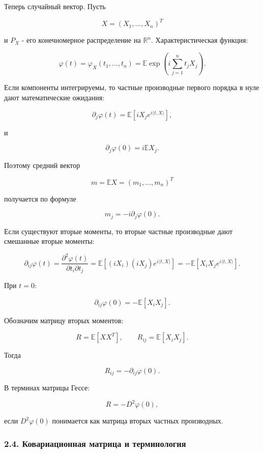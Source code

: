 \documentclass[
  11pt,
  a4paper,
]{article}
\begin{document}
Теперь случайный вектор. Пусть

\[
X=(X_1,\ldots,X_n)^T
\]

и \(P_X\) - его конечномерное распределение на \(\mathbb R^n\).
Характеристическая функция:

\[
\varphi(t)
=
\varphi_X(t_1,\ldots,t_n)
=
\mathbb E\exp\left(i\sum_{j=1}^n t_jX_j\right).
\]

Если компоненты интегрируемы, то частные производные первого порядка в
нуле дают математические ожидания:

\[
\partial_j\varphi(t)
=
\mathbb E\left[iX_j e^{i\langle t,X\rangle}\right],
\]

и

\[
\partial_j\varphi(0)=i\mathbb EX_j.
\]

Поэтому средний вектор

\[
m=\mathbb EX=(m_1,\ldots,m_n)^T
\]

получается по формуле

\[
m_j=-i\partial_j\varphi(0).
\]

Если существуют вторые моменты, то вторые частные производные дают
смешанные вторые моменты:

\[
\partial_{ij}\varphi(t)
=
\frac{\partial^2\varphi(t)}{\partial t_i\partial t_j}
=
\mathbb E\left[(iX_i)(iX_j)e^{i\langle t,X\rangle}\right]
=
-\mathbb E\left[X_iX_j e^{i\langle t,X\rangle}\right].
\]

При \(t=0\):

\[
\partial_{ij}\varphi(0)
=
-\mathbb E[X_iX_j].
\]

Обозначим матрицу вторых моментов:

\[
R=\mathbb E[XX^T],
\qquad
R_{ij}=\mathbb E[X_iX_j].
\]

Тогда

\[
R_{ij}=-\partial_{ij}\varphi(0).
\]

В терминах матрицы Гессе:

\[
R=-D^2\varphi(0),
\]

если \(D^2\varphi(0)\) понимается как матрица вторых частных
производных.

\subsubsection{2.4. Ковариационная матрица и
терминология}\label{ux43aux43eux432ux430ux440ux438ux430ux446ux438ux43eux43dux43dux430ux44f-ux43cux430ux442ux440ux438ux446ux430-ux438-ux442ux435ux440ux43cux438ux43dux43eux43bux43eux433ux438ux44f}
\end{document}
